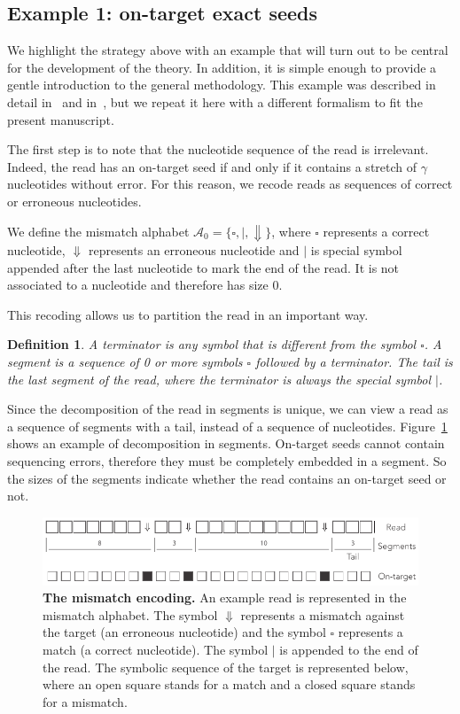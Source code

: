 \documentclass{article}
\newtheorem{definition}{Definition}
\begin{document}
\subsection{Example 1: on-target exact seeds}
\label{sec:example_exact}

We highlight the strategy above with an example that will turn out to be
central for the development of the theory. In addition, it is simple
enough to provide a gentle introduction to the general methodology. This
example was described in detail in~\cite{filion2017analytic} and
in~\cite{filion2018analytic}, but we repeat it here with a different
formalism to fit the present manuscript.

The first step is to note that the nucleotide sequence of the read is
irrelevant. Indeed, the read has an on-target seed if and only if it
contains a stretch of $\gamma$ nucleotides without error. For this reason,
we recode reads as sequences of correct or erroneous nucleotides.

We define the mismatch alphabet $\mathcal{A}_0 = \{\square, |,
\Downarrow\}$, where $\square$ represents a correct nucleotide,
$\Downarrow$ represents an erroneous nucleotide and $|$ is special symbol
appended after the last nucleotide to mark the end of the read. It is not
associated to a nucleotide and therefore has size 0.

This recoding allows us to partition the read in an important way.

\begin{definition}
\label{def:seg}
A terminator is any symbol that is different from the symbol $\square$. A
segment is a sequence of 0 or more symbols $\square$ followed by a
terminator. The tail is the last segment of the read, where the terminator
is always the special symbol $|$.
\end{definition}

Since the decomposition of the read in segments is unique, we can view a
read as a sequence of segments with a tail, instead of a sequence of
nucleotides. Figure~\ref{fig:simple} shows an example of decomposition in
segments. On-target seeds cannot contain sequencing errors, therefore they
must be completely embedded in a segment. So the sizes of the segments
indicate whether the read contains an on-target seed or not.

\begin{figure}[h]
\centering
\includegraphics[scale=0.85]{sketch_simple.pdf}
\caption{\textbf{The mismatch encoding.}
An example read is represented in the mismatch alphabet. The symbol
$\Downarrow$ represents a mismatch against the target (an erroneous
nucleotide) and the symbol $\square$ represents a match (a correct
nucleotide). The symbol $|$ is appended to the end of the read. The
symbolic sequence of the target is represented below, where an open square
stands for a match and a closed square stands for a mismatch.}
\label{fig:simple}
\end{figure}
\end{document}
